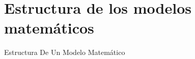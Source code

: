 \section{Estructura de los modelos matemáticos}
\label{sec:formulations}

\begin{frame}{Estructura De Un Modelo Matemático}
  
\end{frame}


